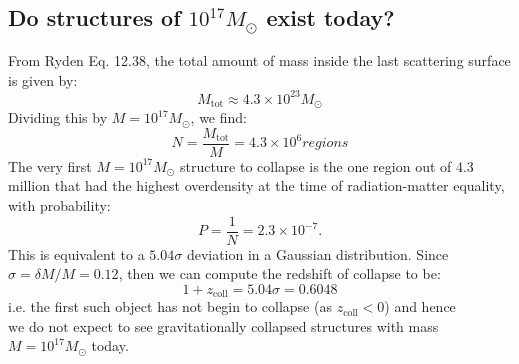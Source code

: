 \subsection{Do structures of $10^{17}M_\odot$ exist today?}
From Ryden Eq. 12.38, the total amount of mass inside the last scattering surface is given by:
\begin{equation}
    M_{\text{tot}} \approx 4.3 \times 10^{23}M_\odot
\end{equation}
Dividing this by $M = 10^{17}M_\odot$, we find:
\begin{equation}
    N = \frac{M_{\text{tot}}}{M} = 4.3 \times 10^6 \si{regions}
\end{equation}
The very first $M = 10^{17}M_\odot$ structure to collapse is the one region out of 4.3 million that had the highest overdensity at the time of radiation-matter equality, with probability:
\begin{equation}
    P = \frac{1}{N} = 2.3 \times 10^{-7}.
\end{equation}
This is equivalent to a $5.04\sigma$ deviation in a Gaussian distribution. Since $\sigma = \delta M/M = 0.12$, then we can compute the redshift of collapse to be:
\begin{equation}
    1 + z_{\text{coll}} = 5.04\sigma = 0.6048
\end{equation}
i.e. the first such object has not begin to collapse (as $z_{\text{coll}} < 0$) and hence $\boxed{\text{we do not}}$ expect to see gravitationally collapsed structures with mass $M = 10^{17}M_\odot$ today.

